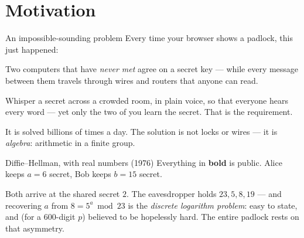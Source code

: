 

\section{Motivation}

\begin{frame}{An impossible-sounding problem}
Every time your browser shows a padlock, this just happened:

\pause

Two computers that have \emph{never met} agree on a secret key —
while every message between them travels through wires and routers
that anyone can read.

\pause

\begin{warning}
Whisper a secret across a crowded room, in plain voice, so that everyone
hears every word — yet only the two of you learn the secret. That is the
requirement.
\end{warning}

\pause

It is solved billions of times a day. The solution is not locks or
wires — it is \emph{algebra}: arithmetic in a finite group.
\end{frame}

\begin{frame}{Diffie--Hellman, with real numbers (1976)}
Everything in \textbf{bold} is public. Alice keeps $a = 6$ secret,
Bob keeps $b = 15$ secret.

\begin{steps}
\end{steps}

\pause

Both arrive at the shared secret $2$. The eavesdropper holds $23, 5, 8, 19$ —
and recovering $a$ from $8 = 5^a \bmod 23$ is the \emph{discrete logarithm
problem}: easy to state, and (for a 600-digit $p$) believed to be hopelessly
hard. The entire padlock rests on that asymmetry.
\end{frame}

